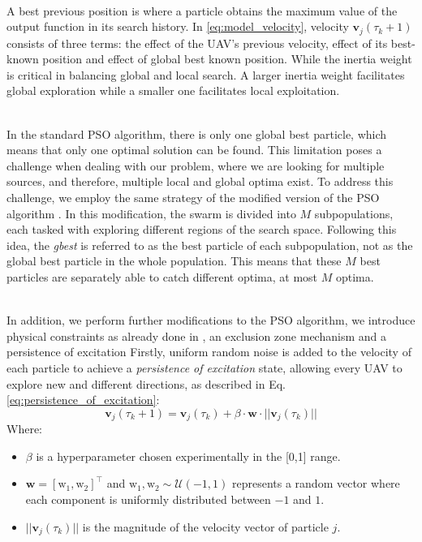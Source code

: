 \documentclass[main]{subfiles}
\begin{document}
\noindent\\
A best previous position is where a particle obtains the 
maximum value of the output function in its search
history.
In \ref{eq:model_velocity}, velocity $\mathbf{v}_{j}(\tau_k+1)$ 
consists of three terms: the effect of the UAV’s previous velocity, 
effect of its best-known position and effect of global best
known position.
While the inertia weight is critical in balancing global and local search. 
A larger inertia weight facilitates global exploration while a smaller one
facilitates local exploitation.

\noindent\\
In the standard PSO algorithm, there is only one global best particle, 
which means that only one optimal solution can be found. This limitation 
poses a challenge when dealing with our problem, where we are looking for multiple sources, 
and therefore, multiple local and global optima exist. To address this challenge, 
we employ the same strategy of the modified version of the PSO algorithm \cite{PSO_IMPORTANT}. 
In this modification, the swarm is divided into $M$ subpopulations, each tasked with exploring 
different regions of the search space. Following this idea, the \textit{gbest} is referred to as 
the best particle of each subpopulation, not as the global best particle in the whole population. 
This means that these $M$ best particles are separately able to catch different optima, 
at most $M$ optima.

\noindent\\
In addition, we perform further modifications to the PSO algorithm,
we introduce physical constraints as already done in \cite{3}, 
an exclusion zone mechanism and a persistence of excitation 
Firstly, uniform random noise is added to the velocity of each 
particle to achieve a \textit{persistence of excitation} state,
allowing every UAV to explore new and different directions, 
as described in Eq.\ref{eq:persistence_of_excitation}:
\begin{equation}
    \mathbf{v}_j(\tau_k + 1) = \mathbf{v}_j(\tau_k) + \beta \cdot \mathbf{w} \cdot ||\mathbf{v}_j(\tau_k)||
\label{eq:persistence_of_excitation}
\end{equation}
Where:
\begin{itemize}
    \item \(\beta\) is a hyperparameter chosen experimentally in the [0,1] range.
    \item \(\mathbf{w} = [\text{w}_1, \text{w}_2]^\top\) and \(\text{w}_1, \text{w}_2 \sim \mathcal{U}(-1, 1)\) represents a random vector where each component is uniformly distributed between \(-1\) and \(1\).
    \item \(||\mathbf{v}_j(\tau_k)||\) is the magnitude of the velocity vector of particle \(j\).
\end{itemize}
\end{document}
